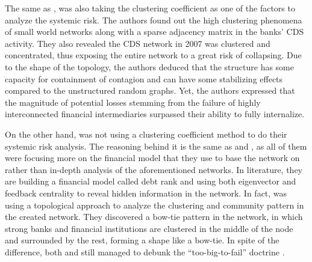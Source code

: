 \documentclass[a4paper,11pt]{article}
\begin{document}
The same as \cite{Lai_Hu_2021}, \cite{Markose_Giansante_Shaghaghi_2012} was also taking the clustering coefficient as one of the factors to analyze the systemic risk. The authors found out the high clustering phenomena of small world networks along with a sparse adjacency matrix in the banks’ CDS activity. They also revealed the CDS network in 2007 was clustered and concentrated, thus exposing the entire network to a great risk of collapsing. Due to the shape of the topology, the authors deduced that the structure has some capacity for containment of contagion and can have some stabilizing effects compared to the unstructured random graphs. Yet, the authors expressed that the magnitude of potential losses stemming from the failure of highly interconnected financial intermediaries surpassed their ability to fully internalize.

On the other hand, \cite{Battiston_Puliga_Kaushik_Tasca_Caldarelli_2012} was not using a clustering coefficient method to do their systemic risk analysis. The reasoning behind it is the same as \cite{Duan_El_Ghoul_Guedhami_Li_Li_2020} and \cite{Zhang_Yin_Sha_2023}, as all of them were focusing more on the financial model that they use to base the network on rather than in-depth analysis of the aforementioned networks. In \cite{Battiston_Puliga_Kaushik_Tasca_Caldarelli_2012} literature, they are building a financial model called debt rank and using both eigenvector and feedback centrality to reveal hidden information in the network. In fact, \cite{Battiston_Puliga_Kaushik_Tasca_Caldarelli_2012} was using a topological approach to analyze the clustering and community pattern in the created network. They discovered a bow-tie pattern in the network, in which strong banks and financial institutions are clustered in the middle of the node and surrounded by the rest, forming a shape like a bow-tie. In spite of the difference, both \cite{Markose_Giansante_Shaghaghi_2012} and \cite{Battiston_Puliga_Kaushik_Tasca_Caldarelli_2012} still managed to debunk the “too-big-to-fail” doctrine \citep{Zhou_2009}.
\end{document}

